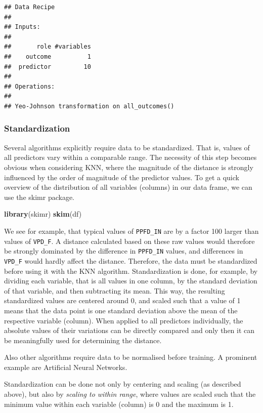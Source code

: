 \documentclass[
]{book}
\newenvironment{Shaded}{\begin{snugshade}}{\end{snugshade}}
\newcommand{\KeywordTok}[1]{\textcolor[rgb]{0.13,0.29,0.53}{\textbf{#1}}}
\newcommand{\NormalTok}[1]{#1}
\begin{document}
\begin{verbatim}
## Data Recipe
## 
## Inputs:
## 
##       role #variables
##    outcome          1
##  predictor         10
## 
## Operations:
## 
## Yeo-Johnson transformation on all_outcomes()
\end{verbatim}

\hypertarget{standardization}{%
\subsubsection{Standardization}\label{standardization}}

Several algorithms explicitly require data to be standardized. That is, values of all predictors vary within a comparable range. The necessity of this step becomes obvious when considering KNN, where the magnitude of the distance is strongly influenced by the order of magnitude of the predictor values. To get a quick overview of the distribution of all variables (columns) in our data frame, we can use the skimr package.

\begin{Shaded}
\begin{Highlighting}[]
\KeywordTok{library}\NormalTok{(skimr)}
\KeywordTok{skim}\NormalTok{(df)}
\end{Highlighting}
\end{Shaded}

We see for example, that typical values of \texttt{PPFD\_IN} are by a factor 100 larger than values of \texttt{VPD\_F}. A distance calculated based on these raw values would therefore be strongly dominated by the difference in \texttt{PPFD\_IN} values, and differences in \texttt{VPD\_F} would hardly affect the distance. Therefore, the data must be standardized before using it with the KNN algorithm. Standardization is done, for example, by dividing each variable, that is all values in one column, by the standard deviation of that variable, and then subtracting its mean. This way, the resulting standardized values are centered around 0, and scaled such that a value of 1 means that the data point is one standard deviation above the mean of the respective variable (column). When applied to all predictors individually, the absolute values of their variations can be directly compared and only then it can be meaningfully used for determining the distance.

Also other algorithms require data to be normalised before training. A prominent example are Artificial Neural Networks.

Standardization can be done not only by centering and scaling (as described above), but also by \emph{scaling to within range}, where values are scaled such that the minimum value within each variable (column) is 0 and the maximum is 1.
\end{document}

